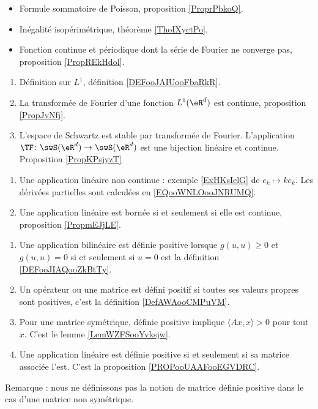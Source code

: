 \begin{itemize}
    \item Formule sommatoire de Poisson, proposition \ref{ProprPbkoQ}.
    \item Inégalité isopérimétrique, théorème \ref{ThoIXyctPo}.
    \item Fonction continue et périodique dont la série de Fourier ne converge pas, proposition \ref{PropREkHdol}.
\end{itemize}

\begin{enumerate}
    \item
        Définition sur \( L^1\), définition \ref{DEFooJAIUooFbaRkR}.
    \item
        La transformée de Fourier d'une fonction \( L^1(\eR^d)\) est continue, proposition \ref{PropJvNfj}.
    \item
    L'espace de Schwartz est stable par transformée de Fourier. L'application $\TF\colon \swS(\eR^d)\to \swS(\eR^d)$ est une bijection linéaire et continue. Proposition  \ref{PropKPsjyzT}
\end{enumerate}

\begin{enumerate}
    \item
        Une application linéaire non continue : exemple \ref{ExHKsIelG} de \( e_k\mapsto ke_k\). Les dérivées partielles sont calculées en \eqref{EQooWNLOooJNRUMQ}.
    \item
        Une application linéaire est bornée si et seulement si elle est continue, proposition \ref{PropmEJjLE}.
\end{enumerate}

\begin{enumerate}
    \item
        Une application bilinéaire est définie positive lorsque \( g(u,u)\geq 0\) et \( g(u,u)=0\) si et seulement si \( u=0\) est la définition \ref{DEFooJIAQooZkBtTy}.
    \item
        Un opérateur ou une matrice est défini positif si toutes ses valeurs propres sont positives, c'est la définition \ref{DefAWAooCMPuVM}.
    \item
        Pour une matrice symétrique, définie positive implique \( \langle Ax, x\rangle >0\) pour tout \( x\). C'est le lemme \ref{LemWZFSooYvksjw}.
    \item
        Une application linéaire est définie positive si et seulement si sa matrice associée l'est. C'est la proposition \ref{PROPooUAAFooEGVDRC}.
\end{enumerate}
Remarque : nous ne définissons pas la notion de matrice définie positive dans le cas d'une matrice non symétrique.

